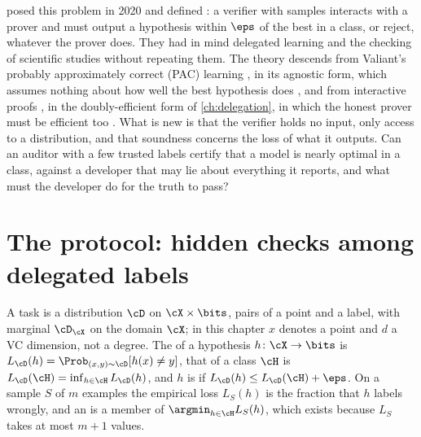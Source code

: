 \begin{refsection}
\textcite{GoldwasserEtAl2021} posed this problem in 2020 and defined : a verifier with samples interacts with a prover and must output a hypothesis within $\eps$ of the best in a class, or reject, whatever the prover does. They had in mind delegated learning and the checking of scientific studies without repeating them. The theory descends from Valiant's probably approximately correct (PAC) learning \parencite{Valiant1984}, in its agnostic form, which assumes nothing about how well the best hypothesis does \parencite{Haussler1992,KearnsSchapireSellie1994}, and from interactive proofs \parencite{GoldwasserMicaliRackoff1989}, in the doubly-efficient form of \cref{ch:delegation}, in which the honest prover must be efficient too \parencite{GoldwasserKalaiRothblum2015}. What is new is that the verifier holds no input, only access to a distribution, and that soundness concerns the loss of what it outputs. Can an auditor with a few trusted labels certify that a model is nearly optimal in a class, against a developer that may lie about everything it reports, and what must the developer do for the truth to pass?

\section{The protocol: hidden checks among delegated labels}\label{sec:pacverify:protocol}

A task is a distribution $\cD$ on $\cX\times\bits$, pairs of a point and a label, with marginal $\cD_\cX$ on the domain $\cX$; in this chapter $x$ denotes a point and $d$ a VC dimension, not a degree. The  of a hypothesis $h\colon\cX\to\bits$ is $L_\cD(h)=\Prob_{(x,y)\sim\cD}[h(x)\ne y]$, that of a class $\cH$ is $L_\cD(\cH)=\inf_{h\in\cH}L_\cD(h)$, and $h$ is  if $L_\cD(h)\le L_\cD(\cH)+\eps$. On a sample $S$ of $m$ examples the empirical loss $L_S(h)$ is the fraction that $h$ labels wrongly, and an  is a member of $\argmin_{h\in\cH}L_S(h)$, which exists because $L_S$ takes at most $m+1$ values.


\end{refsection}
